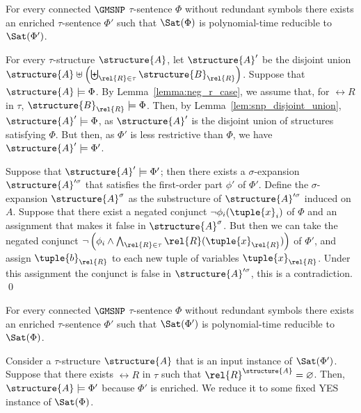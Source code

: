 \documentclass{lmcs}
\begin{document}
\begin{lem}\label{lemma:non_empty_equiv1} 
For every connected $\GMSNP$ $\tau$-sentence $\Phi$ without redundant symbols there exists an enriched $\tau$-sentence $\Phi'$ such that $\Sat(\Phi)$ is polynomial-time reducible to $\Sat(\Phi')$.
\end{lem}
\proof
For every $\tau$-structure $\structure{A}$, let $\structure{A}'$ be the disjoint union $\structure{A} \uplus \left(\biguplus_{\rel{R}\in\tau}\structure{B}_\rel{R}\right)$.
Suppose that $\structure{A}\models\Phi$.
By Lemma~\ref{lemma:neg_r_case}, we assume that, for $\rel{R}$ in $\tau$, $\structure{B}_\rel{R}\models\Phi$.
Then, by Lemma~\ref{lem:snp_disjoint_union}, $\structure{A}'\models\Phi$, as $\structure{A}'$ is the disjoint union of structures satisfying $\Phi$.
But then, as $\Phi'$ is less restrictive than $\Phi$, we have $\structure{A}'\models\Phi'$.


Suppose that $\structure{A}'\models\Phi'$; then there exists a $\sigma$-expansion $\structure{A}'^\sigma$ that satisfies the first-order part $\phi'$ of $\Phi'$.
Define the $\sigma$-expansion $\structure{A}^\sigma$ as the substructure of $\structure{A}'^\sigma$ induced on $A$.
Suppose that there exist a negated conjunct $\neg\phi_i(\tuple{x}_i)$ of $\Phi$ and an assignment that makes it false in $\structure{A}^\sigma$.
But then we can take the negated conjunct $\neg\left(\phi_i\wedge \bigwedge_{\rel{R}\in\tau}\rel{R}(\tuple{x}_\rel{R})\right)$ of $\Phi'$, and assign $\tuple{b}_\rel{R}$ to each new tuple of variables $\tuple{x}_\rel{R}$.
Under this assignment the conjunct is false in $\structure{A}'^\sigma$, this is a contradiction.
\qed

\begin{lem}\label{lemma:non_empty_equiv2}
For every connected $\GMSNP$ $\tau$-sentence $\Phi$ without redundant symbols there exists an enriched $\tau$-sentence $\Phi'$ such that $\Sat(\Phi')$ is polynomial-time reducible to $\Sat(\Phi)$.
\end{lem}
\proof
Consider a $\tau$-structure $\structure{A}$ that is an input instance of $\Sat(\Phi')$.
Suppose that there exists $\rel{R}$ in $\tau$ such that $\rel{R}^\structure{A}=\varnothing$.
Then, $\structure{A}\models\Phi'$ because $\Phi'$ is enriched.
We reduce it to some fixed YES instance of $\Sat(\Phi)$.
\end{document}
